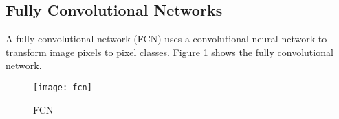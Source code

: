 \subsection{Fully Convolutional Networks}
\label{sec:fully-conv-netw}

A fully convolutional network (FCN) uses a convolutional neural network to transform image pixels to pixel classes.
Figure \ref{fig:fcn} shows the fully convolutional network.

\begin{figure}[!htbp]
  \centering
  \texttt{[image: fcn]}
  \caption{FCN}
  \label{fig:fcn}
\end{figure}


